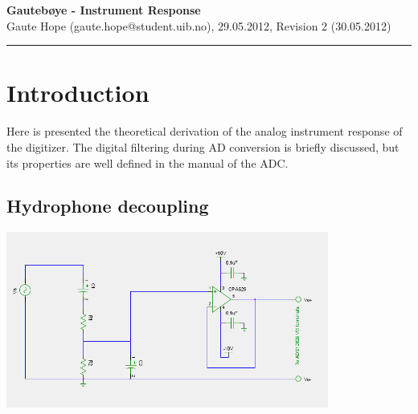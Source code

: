 \documentclass[a4paper]{article}
\newcommand{\makeheading}[2]%
        {\hspace*{-\marginparsep minus \marginparwidth}%
         \begin{minipage}[t]{\textwidth\marginparwidth\marginparsep}%
           {\large \bfseries #1}\\{#2}\\[-0.15\baselineskip]%
                 \rule{\columnwidth}{1pt}%
         \end{minipage}}
\begin{document}
\makeheading{Gautebøye - Instrument Response}{Gaute Hope
(gaute.hope@student.uib.no), 29.05.2012, Revision 2 (30.05.2012)}

\vspace{2em}
\section*{Introduction} Here is presented the theoretical derivation of
the analog instrument response of the digitizer. The digital filtering
during AD conversion is briefly discussed, but its properties are well
defined in the manual of the ADC.
\vspace{2em}

\begin{multicols}{2}
\section{Hydrophone decoupling}
\end{multicols}
\begin{center}
  \includegraphics[width=400px]{Hydrophone_decoupling.png}
  \label{fig:hydrophone_decoupling}
\end{center}
\end{document}
